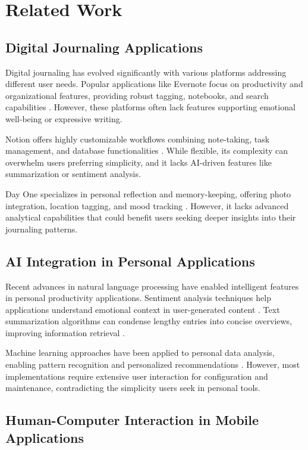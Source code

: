 \documentclass[conference]{IEEEtran}
\begin{document}
\section{Related Work}

\subsection{Digital Journaling Applications}

Digital journaling has evolved significantly with various platforms addressing different user needs. Popular applications like Evernote focus on productivity and organizational features, providing robust tagging, notebooks, and search capabilities \cite{evernote2023features}. However, these platforms often lack features supporting emotional well-being or expressive writing.

Notion offers highly customizable workflows combining note-taking, task management, and database functionalities \cite{notion2023platform}. While flexible, its complexity can overwhelm users preferring simplicity, and it lacks AI-driven features like summarization or sentiment analysis.

Day One specializes in personal reflection and memory-keeping, offering photo integration, location tagging, and mood tracking \cite{dayone2023features}. However, it lacks advanced analytical capabilities that could benefit users seeking deeper insights into their journaling patterns.

\subsection{AI Integration in Personal Applications}

Recent advances in natural language processing have enabled intelligent features in personal productivity applications. Sentiment analysis techniques help applications understand emotional context in user-generated content \cite{liu2012sentiment}. Text summarization algorithms can condense lengthy entries into concise overviews, improving information retrieval \cite{allahyari2017text}.

Machine learning approaches have been applied to personal data analysis, enabling pattern recognition and personalized recommendations \cite{chen2019personalized}. However, most implementations require extensive user interaction for configuration and maintenance, contradicting the simplicity users seek in personal tools.

\subsection{Human-Computer Interaction in Mobile Applications}
\end{document}
